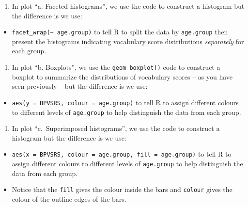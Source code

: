 \documentclass[
  letterpaper,
  DIV=11,
  numbers=noendperiod]{scrreprt}
\providecommand{\tightlist}{%
  \setlength{\itemsep}{0pt}\setlength{\parskip}{0pt}}\usepackage{longtable,booktabs,array}
\begin{document}
\begin{enumerate}
\def\labelenumi{\arabic{enumi}.}
\tightlist
\item
  In plot ``a. Faceted histograms'', we use the code to construct a
  histogram but the difference is we use:
\end{enumerate}

\begin{itemize}
\tightlist
\item
  \texttt{facet\_wrap(\textasciitilde{}\ age.group)} to tell R to split
  the data by \texttt{age.group} then present the histograms indicating
  vocabulary score distributions \emph{separately} for each group.
\end{itemize}

\begin{enumerate}
\def\labelenumi{\arabic{enumi}.}
\setcounter{enumi}{1}
\tightlist
\item
  In plot ``b. Boxplots'', we use the \texttt{geom\_boxplot()} code to
  construct a boxplot to summarize the distributions of vocabulary
  scores -- as you have seen previously -- but the difference is we use:
\end{enumerate}

\begin{itemize}
\tightlist
\item
  \texttt{aes(y\ =\ BPVSRS,\ colour\ =\ age.group)} to tell R to assign
  different colours to different levels of \texttt{age.group} to help
  distinguish the data from each group.
\end{itemize}

\begin{enumerate}
\def\labelenumi{\arabic{enumi}.}
\setcounter{enumi}{2}
\tightlist
\item
  In plot ``c.~Superimposed histograms'', we use the code to construct a
  histogram but the difference is we use:
\end{enumerate}

\begin{itemize}
\tightlist
\item
  \texttt{aes(x\ =\ BPVSRS,\ colour\ =\ age.group,\ fill\ =\ age.group)}
  to tell R to assign different colours to different levels of
  \texttt{age.group} to help distinguish the data from each group.
\item
  Notice that the \texttt{fill} gives the colour inside the bars and
  \texttt{colour} gives the colour of the outline edges of the bars.
\end{itemize}
\end{document}
